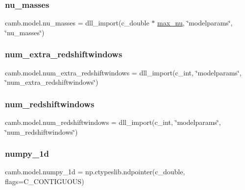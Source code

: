 \subsubsection{\texorpdfstring{nu\+\_\+masses}{nu\_masses}}
{\footnotesize\ttfamily camb.\+model.\+nu\+\_\+masses = dll\+\_\+import(c\+\_\+double $\ast$ \mbox{\hyperlink{namespacecamb_1_1model_aa5aed77e19cbb25b308fbdd5e9cea419}{max\+\_\+nu}}, \char`\"{}modelparams\char`\"{}, \char`\"{}nu\+\_\+masses\char`\"{})}

\mbox{\label{namespacecamb_1_1model_ab77a78e6a26359172cfb4562fc2ab13d}} 
\subsubsection{\texorpdfstring{num\+\_\+extra\+\_\+redshiftwindows}{num\_extra\_redshiftwindows}}
{\footnotesize\ttfamily camb.\+model.\+num\+\_\+extra\+\_\+redshiftwindows = dll\+\_\+import(c\+\_\+int, \char`\"{}modelparams\char`\"{}, \char`\"{}num\+\_\+extra\+\_\+redshiftwindows\char`\"{})}

\mbox{\label{namespacecamb_1_1model_a0a5db0e872ad478aca4a0554ad6792d2}} 
\subsubsection{\texorpdfstring{num\+\_\+redshiftwindows}{num\_redshiftwindows}}
{\footnotesize\ttfamily camb.\+model.\+num\+\_\+redshiftwindows = dll\+\_\+import(c\+\_\+int, \char`\"{}modelparams\char`\"{}, \char`\"{}num\+\_\+redshiftwindows\char`\"{})}

\mbox{\label{namespacecamb_1_1model_ac096bb2d0fd67a2f7b5b791a0f29e117}} 
\subsubsection{\texorpdfstring{numpy\+\_\+1d}{numpy\_1d}}
{\footnotesize\ttfamily camb.\+model.\+numpy\+\_\+1d = np.\+ctypeslib.\+ndpointer(c\+\_\+double, flags=\textquotesingle{}C\+\_\+\+C\+O\+N\+T\+I\+G\+U\+O\+US\textquotesingle{})}

